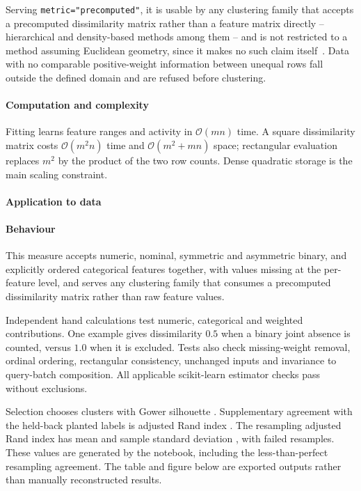 Serving \texttt{metric="precomputed"}, it is usable by any clustering
family that accepts a precomputed dissimilarity matrix rather than a
feature matrix directly -- hierarchical and density-based methods among
them -- and is not restricted to a method assuming Euclidean geometry,
since it makes no such claim itself~\cite{ref_34}. Data with no comparable
positive-weight information between unequal rows fall outside the
defined domain and are refused before clustering.

\paragraph{Computation and complexity}
\label{sec:measure:gower:complexity}
Fitting learns feature ranges and activity in $\mathcal{O}(mn)$ time.
A square dissimilarity matrix costs $\mathcal{O}(m^2n)$ time and
$\mathcal{O}(m^2+mn)$ space; rectangular evaluation replaces $m^2$ by the
product of the two row counts. Dense quadratic storage is the main
scaling constraint.

\paragraph{Application to \projectname{} data}
\label{sec:measure:gower:application}

\paragraph{Behaviour}
\label{sec:measure:gower:behaviour}
This measure accepts numeric, nominal, symmetric and asymmetric binary,
and explicitly ordered categorical features together, with values missing
at the per-feature level, and serves any clustering family that consumes
a precomputed dissimilarity matrix rather than raw feature values.

Independent hand calculations test numeric, categorical and weighted
contributions. One example gives dissimilarity $0.5$ when a binary joint
absence is counted, versus $1.0$ when it is excluded. Tests also check
missing-weight removal, ordinal ordering, rectangular consistency,
unchanged inputs and invariance to query-batch composition.
All applicable scikit-learn estimator checks pass without exclusions.

Selection chooses \GowerSelectedK{} clusters with Gower silhouette
\GowerSilhouette{}. Supplementary agreement with the held-back planted
labels is adjusted Rand index \GowerPlantedARI{}. The resampling adjusted
Rand index has mean \GowerStabilityMean{} and sample standard deviation
\GowerStabilitySD{}, with \GowerStabilityFailures{} failed resamples.
These values are generated by the notebook, including the
less-than-perfect resampling agreement. The table and figure below are
exported outputs rather than manually reconstructed results.

